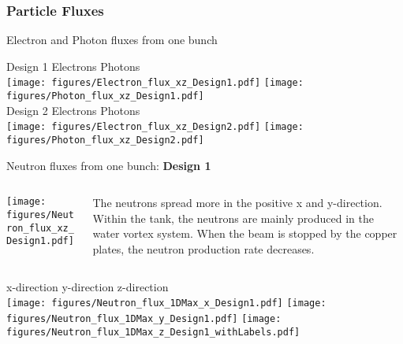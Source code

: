 \documentclass[xcolor={dvipsnames}]{beamer}
\begin{document}
\subsubsection{Particle Fluxes}

\begin{frame}{Electron and Photon fluxes from one bunch}
\begin{center}
Design 1 \hspace*{1.4cm} Electrons \hfill Photons \hspace*{3.1cm} \\
 \texttt{[image: figures/Electron\_flux\_xz\_Design1.pdf]}
  \texttt{[image: figures/Photon\_flux\_xz\_Design1.pdf]}\\
Design 2 \hspace*{1.4cm} Electrons \hfill Photons \hspace*{3.1cm} \\ 
\texttt{[image: figures/Electron\_flux\_xz\_Design2.pdf]}
  \texttt{[image: figures/Photon\_flux\_xz\_Design2.pdf]}
\end{center}
\end{frame}
\begin{frame}{Neutron fluxes from one bunch: \textbf{Design 1}}
\begin{columns}
 \begin{column}{0.5\textwidth}
    \texttt{[image: figures/Neutron\_flux\_xz\_Design1.pdf]}
 \end{column}
 \begin{column}{0.5\textwidth}
  The neutrons spread more in the positive x and y-direction. Within the tank, the neutrons are mainly produced in the water vortex system. When the beam is stopped by the copper plates, the neutron production rate decreases.
 \end{column}
\end{columns}
\hspace*{1cm} x-direction \hfill y-direction \hfill z-direction \hspace*{1cm} \\
  \texttt{[image: figures/Neutron\_flux\_1DMax\_x\_Design1.pdf]}\hfill
  \texttt{[image: figures/Neutron\_flux\_1DMax\_y\_Design1.pdf]}\hfill
  \texttt{[image: figures/Neutron\_flux\_1DMax\_z\_Design1\_withLabels.pdf]}
\end{frame}
\end{document}
